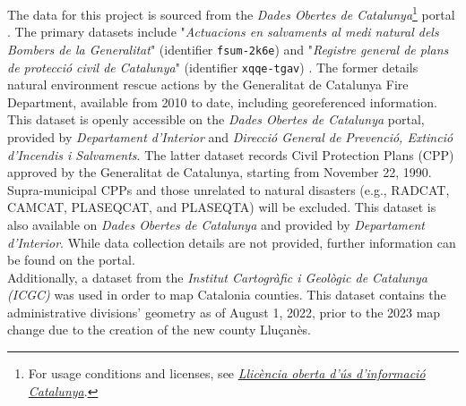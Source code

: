 \documentclass[
  journal=small,
  manuscript=mini-article,  %
  year=2023,
  volume=1,
]{odj-journal}
\begin{document}
The data for this project is sourced from the \textit{Dades Obertes de Catalunya}\footnote{For usage conditions and licenses, see \href{https://governobert.gencat.cat/ca/dades_obertes/llicencia-oberta-informacio-catalunya/}{\textit{Llicència oberta d'ús d'informació Catalunya}}.} portal \cite{dades_obertes}. The primary datasets include "\textit{Actuacions en salvaments al medi natural dels Bombers de la Generalitat}" (identifier \texttt{fsum-2k6e}) \cite{fd_rescue} and "\textit{Registre general de plans de protecció civil de Catalunya}" (identifier \texttt{xqqe-tgav}) \cite{CPP}. The former details natural environment rescue actions by the Generalitat de Catalunya Fire Department, available from 2010 to date, including georeferenced information. This dataset is openly accessible on the \textit{Dades Obertes de Catalunya} portal, provided by \textit{Departament d'Interior} and \textit{Direcció General de Prevenció, Extinció d'Incendis i Salvaments}. The latter dataset records Civil Protection Plans (CPP) approved by the Generalitat de Catalunya, starting from November 22, 1990. Supra-municipal CPPs and those unrelated to natural disasters (e.g., RADCAT, CAMCAT, PLASEQCAT, and PLASEQTA) will be excluded. This dataset is also available on \textit{Dades Obertes de Catalunya} and provided by \textit{Departament d'Interior}. While data collection details are not provided, further information can be found on the portal.\\

Additionally, a dataset from the \textit{Institut Cartogràfic i Geològic de Catalunya (ICGC)} \cite{geo_dades} was used in order to map Catalonia counties. This dataset contains the administrative divisions' geometry as of August 1, 2022, prior to the 2023 map change due to the creation of the new county Lluçanès.
\end{document}
